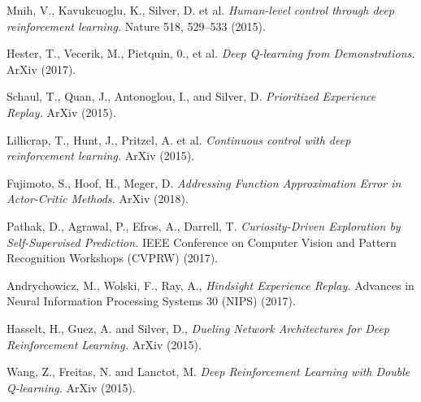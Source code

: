 \documentclass[12pt,a4paper]{article}
\begin{document}
\begin{thebibliography}{99}


  Mnih, V., Kavukcuoglu, K., Silver, D. et al. 
  {\em Human-level control through deep reinforcement learning.} 
   Nature 518, 529–533 (2015).

  Hester, T., Vecerik, M., Pietquin, 0., et al. 
  {\em Deep Q-learning from Demonstrations.}
  ArXiv (2017).

  Schaul, T., Quan, J., Antonoglou, I., and Silver, D.
  {\em Prioritized Experience Replay.}
  ArXiv (2015).

  Lillicrap, T., Hunt, J., Pritzel, A. et al.
  {\em Continuous control with deep reinforcement learning.}
  ArXiv (2015).

  Fujimoto, S., Hoof, H., Meger, D.
  {\em Addressing Function Approximation Error in Actor-Critic Methods.}
  ArXiv (2018).

   Pathak, D., Agrawal, P., Efros, A., Darrell, T.
  {\em Curiosity-Driven Exploration by Self-Supervised Prediction.}
  IEEE Conference on Computer Vision and Pattern Recognition Workshops (CVPRW) (2017).

   Andrychowicz, M., Wolski, F., Ray, A.,
  {\em Hindsight Experience Replay.}
  Advances in Neural Information Processing Systems 30 (NIPS) (2017).


   Hasselt, H., Guez, A. and Silver, D., 
  {\em Dueling Network Architectures for Deep Reinforcement Learning.}
  ArXiv (2015).

   Wang, Z., Freitas, N. and Lanctot, M. 
  {\em Deep Reinforcement Learning with Double Q-learning.}
  ArXiv (2015).

\end{thebibliography}
	
\end{document}
